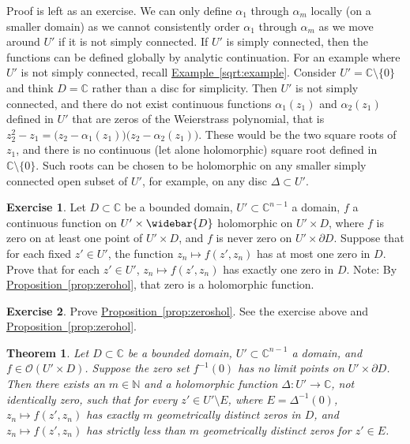 \documentclass[12pt,openany]{book}
\newcommand{\C}{{\mathbb{C}}}
\newcommand{\N}{{\mathbb{N}}}
\newcommand{\sO}{{\mathscr{O}}}
\theoremstyle{plain}
\newtheorem{thm}{Theorem}[section]
\theoremstyle{remark}
\theoremstyle{definition}
\newenvironment{exbox}{%
    \def\FrameCommand{\vrule width 1pt \relax\hspace{10pt}}%
    \MakeFramed{\advance\hsize-\width\FrameRestore}%
}{%
    \endMakeFramed
}
\theoremstyle{exercise}
\newtheorem{exercise}{Exercise}[section]
\theoremstyle{example}
\newcommand{\exampleref}[1]{\hyperref[#1]{Example~\ref*{#1}}}
\newcommand{\propref}[1]{\hyperref[#1]{Proposition~\ref*{#1}}}
\begin{document}
Proof is left as an exercise.
We can only define $\alpha_1$ through $\alpha_m$ locally (on a
smaller domain) as we cannot consistently order
$\alpha_1$ through $\alpha_m$ as we move around
$U'$ if it is not simply connected.  If $U'$ is simply connected, then
the functions can be defined globally by analytic continuation.
For an example where $U'$ is not simply connected,
recall \exampleref{sqrt:example}. Consider $U' = \C \setminus \{ 0 \}$ and
think $D=\C$ rather than a disc for simplicity.  Then $U'$ is not simply
connected, and there do not exist continuous functions
$\alpha_1(z_1)$ and
$\alpha_2(z_1)$ defined in $U'$ that are zeros
of the Weierstrass polynomial, that is
$z_2^2 - z_1 =
\bigl(z_2-\alpha_1(z_1) \bigr)
\bigl(z_2-\alpha_2(z_1) \bigr)$.
These would be the two square roots of $z_1$, and there is no continuous
(let alone holomorphic) square root defined in $\C \setminus \{ 0 \}$.
Such roots can be chosen to be holomorphic on any smaller
simply connected open subset of $U'$, for
example, on any disc $\Delta \subset U'$.


\begin{exbox}
\begin{exercise}
Let $D \subset \C$ be a bounded domain, $U' \subset \C^{n-1}$
a domain,
$f$ a continuous function on $U' \times \widebar{D}$ holomorphic
on $U' \times D$,
where $f$ is zero on at least one point
of $U' \times D$, and $f$ is never zero on
$U' \times \partial D$.
Suppose that for each fixed $z' \in U'$, the function
$z_n \mapsto f(z',z_n)$
has at most one zero in $D$.  Prove that for each $z' \in U'$,
$z_n \mapsto f(z',z_n)$ has exactly one zero in $D$.
Note: By \propref{prop:zerohol}, that zero is
a holomorphic function.
\end{exercise}

\begin{exercise}
Prove \propref{prop:zeroshol}.
See the exercise above and \propref{prop:zerohol}.
\end{exercise}
\end{exbox}

\begin{thm} \label{thm:discrthm}
\pagebreak[2]
Let $D \subset \C$ be a bounded domain,
$U' \subset \C^{n-1}$ a domain,
and
$f \in \sO(U' \times D)$.
Suppose the zero set $f^{-1}(0)$ has no limit points
on $U' \times \partial D$.
Then there exists an $m \in \N$
and
a holomorphic function $\Delta \colon U' \to \C$, not identically zero, such
that for every $z' \in U' \setminus E$, where $E = \Delta^{-1}(0)$,
$z_n \mapsto f(z',z_n)$ has exactly $m$ geometrically distinct zeros in $D$,
and $z_n \mapsto f(z',z_n)$ has strictly less than $m$ geometrically distinct
zeros for $z' \in E$.
\end{thm}
\end{document}
